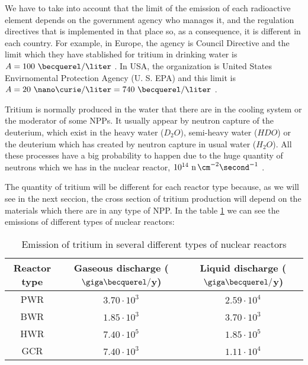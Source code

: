 We have to take into account that the limit of the emission of each radioactive element depends on the government agency who manages it, and the regulation directives that is implemented in that place so, as a consequence, it is different in each country. For example, in Europe, the agency is Council Directive and the limit which they have stablished for tritium in drinking water is $A = 100~\becquerel/\liter$ \cite{100BqL}. In USA, the organization is United States Envirnomental Protection Agency (U. S. EPA) and this limit is $A = 20~\nano\curie/\liter = 740~\becquerel/\liter$ \cite{740BqL}.

Tritium is normally produced in the water that there are in the cooling system or the moderator of some NPPs. It usually appear by neutron capture of the deuterium, which exist in the heavy water ($D_2 O$), semi-heavy water ($H D O$) or the deuterium which has created by neutron capture in usual water ($H_2 O$). All these processes have a big probability to happen due to the huge quantity of neutrons which we has in the nuclear reactor, $10^{14} ~\ce{n} \, \cm^{-2} \second^{-1}$ \cite{CrossSeccionNeutrons}. 

The quantity of tritium will be different for each reactor type because, as we will see in the next seccion, the cross section of tritium production will depend on the materials which there are in any type of NPP. In the table \ref{tab:TritiumEmisionsNPPs} we can see the emissions of different types of nuclear reactors:

\begin{table}[htbp]
\begin{center}
\begin{tabular}{|c|c|c|}
\hline
Reactor type & Gaseous discharge ($\giga\becquerel/$y) & Liquid discharge ($\giga\becquerel/$y) \\
\hline \hline \hline
PWR & $3.70\cdot 10^{3}$ & $2.59\cdot 10^{4}$ \\ \hline
BWR & $1.85\cdot 10^{3}$ & $3.70\cdot 10^{3}$ \\ \hline
HWR & $7.40\cdot 10^{5}$ & $1.85\cdot 10^{5}$ \\ \hline
GCR & $7.40\cdot 10^{3}$ & $1.11\cdot 10^{4}$ \\ \hline
\end{tabular}
\caption{Emission of tritium in several different types of nuclear reactors\cite{CommonEmissionTritium}}
\label{tab:TritiumEmisionsNPPs}
\end{center}
\end{table} 

